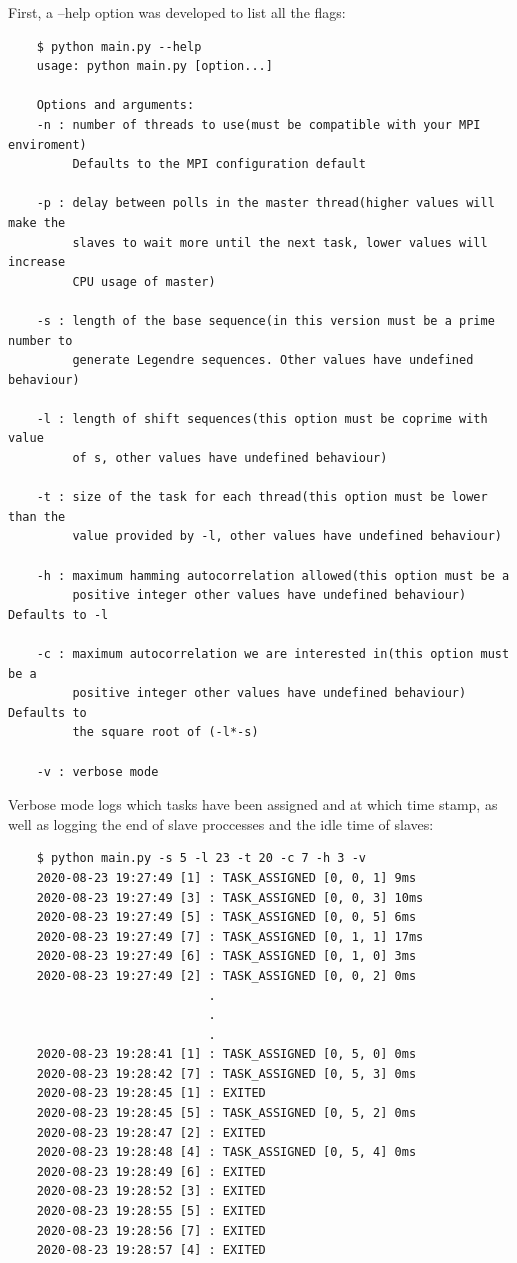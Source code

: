   First, a --help option was developed to list all the flags:
  \begin{lstlisting}
    $ python main.py --help
    usage: python main.py [option...]

    Options and arguments:
    -n : number of threads to use(must be compatible with your MPI enviroment)
         Defaults to the MPI configuration default

    -p : delay between polls in the master thread(higher values will make the
         slaves to wait more until the next task, lower values will increase
         CPU usage of master)

    -s : length of the base sequence(in this version must be a prime number to
         generate Legendre sequences. Other values have undefined behaviour)

    -l : length of shift sequences(this option must be coprime with value
         of s, other values have undefined behaviour)

    -t : size of the task for each thread(this option must be lower than the
         value provided by -l, other values have undefined behaviour)

    -h : maximum hamming autocorrelation allowed(this option must be a
         positive integer other values have undefined behaviour) Defaults to -l

    -c : maximum autocorrelation we are interested in(this option must be a
         positive integer other values have undefined behaviour) Defaults to
         the square root of (-l*-s)

    -v : verbose mode
  \end{lstlisting}

  Verbose mode logs which tasks have been assigned and at which time stamp, as
  well as logging the end of slave proccesses and the idle time of slaves:

  \begin{lstlisting}
    $ python main.py -s 5 -l 23 -t 20 -c 7 -h 3 -v
    2020-08-23 19:27:49 [1] : TASK_ASSIGNED [0, 0, 1] 9ms
    2020-08-23 19:27:49 [3] : TASK_ASSIGNED [0, 0, 3] 10ms
    2020-08-23 19:27:49 [5] : TASK_ASSIGNED [0, 0, 5] 6ms
    2020-08-23 19:27:49 [7] : TASK_ASSIGNED [0, 1, 1] 17ms
    2020-08-23 19:27:49 [6] : TASK_ASSIGNED [0, 1, 0] 3ms
    2020-08-23 19:27:49 [2] : TASK_ASSIGNED [0, 0, 2] 0ms
                            .
                            .
                            .
    2020-08-23 19:28:41 [1] : TASK_ASSIGNED [0, 5, 0] 0ms
    2020-08-23 19:28:42 [7] : TASK_ASSIGNED [0, 5, 3] 0ms
    2020-08-23 19:28:45 [1] : EXITED
    2020-08-23 19:28:45 [5] : TASK_ASSIGNED [0, 5, 2] 0ms
    2020-08-23 19:28:47 [2] : EXITED
    2020-08-23 19:28:48 [4] : TASK_ASSIGNED [0, 5, 4] 0ms
    2020-08-23 19:28:49 [6] : EXITED
    2020-08-23 19:28:52 [3] : EXITED
    2020-08-23 19:28:55 [5] : EXITED
    2020-08-23 19:28:56 [7] : EXITED
    2020-08-23 19:28:57 [4] : EXITED

  \end{lstlisting}


